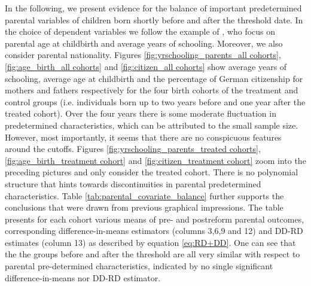 \documentclass[a4paper ]{article}
\begin{document}
In the following, we present evidence for the balance of important predetermined parental variables of children born shortly before and after the threshold date. In the choice of dependent variables we follow the example of \cite{Dahl2016Case}, who focus on parental age at childbirth and average years of schooling. Moreover, we also consider parental nationality. \newline  Figures \ref{fig:yrschooling_parents_all cohorts}, \ref{fig:age_birth_all cohorts}  and \ref{fig:citizen_all cohorts} show average years of schooling, average age at childbirth and the percentage of German citizenship for mothers and fathers respectively for the four birth cohorts of the treatment and control groups (i.e. individuals born up to two years before and one year after the treated cohort). Over the four years there is some moderate fluctuation in predetermined characteristics, which can be attributed to the small sample size. However, most importantly, it seems that there are no conspicuous features around the cutoffs. Figures \ref{fig:yrschooling_parents_treated cohorts}, \ref{fig:age_birth_treatment cohort} and \ref{fig:citizen_treatment cohort} zoom into the preceding pictures and only consider the treated cohort. There is no polynomial structure that hints towards discontinuities in parental predetermined characteristics.  \newline Table \ref{tab:parental_covariate_balance} further supports the conclusions that were drawn from previous graphical impressions. The table presents for each cohort various means of pre- and postreform parental outcomes,  corresponding difference-in-means estimators (columns 3,6,9 and 12) and DD-RD estimates (column 13) as described by equation \ref{eq:RD+DD}. One can see that the the groups before and after the threshold are all very similar with respect to parental pre-determined characteristics, indicated by no single significant difference-in-means nor DD-RD estimator.\newline%
\end{document}
